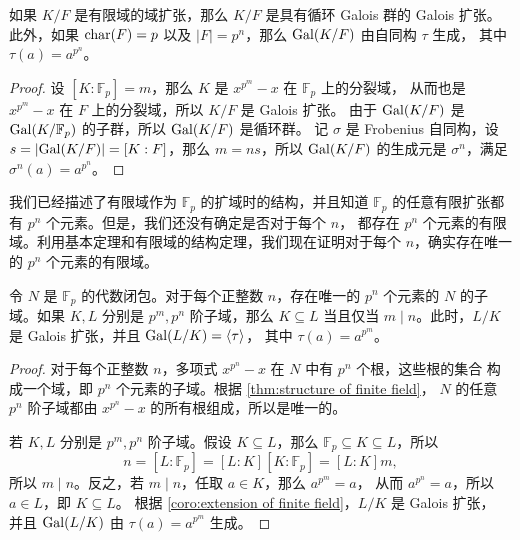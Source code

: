 \begin{corollary}\label{coro:extension of finite field}
  如果 $K/F$ 是有限域的域扩张，那么 $K/F$ 是具有循环 Galois 群的 Galois 扩张。
  此外，如果 $\operatorname{char}(F)=p$ 以及 $|F|=p^n$，那么 $\operatorname{Gal}(K/F)$ 由自同构 $\tau$ 生成，
  其中 $\tau(a)=a^{p^n}$。
\end{corollary}
\begin{proof}
  设 $[K:\mathbb{F}_p]=m$，那么 $K$ 是 $x^{p^m}-x$ 在 $\mathbb{F}_p$ 上的分裂域，
  从而也是 $x^{p^m}-x$ 在 $F$ 上的分裂域，所以 $K/F$ 是 Galois 扩张。
  由于 $\operatorname{Gal}(K/F)$ 是 $\operatorname{Gal}(K/\mathbb{F}_p)$ 的子群，所以 $\operatorname{Gal}(K/F)$ 是循环群。
  记 $\sigma$ 是 Frobenius 自同构，设 $s=\lvert\operatorname{Gal}(K/F)\rvert=[K:F]$，那么
  $m=ns$，所以 $\operatorname{Gal}(K/F)$ 的生成元是 $\sigma^n$，满足 $\sigma^n(a)=a^{p^n}$。
\end{proof}

我们已经描述了有限域作为 $\mathbb{F}_p$ 的扩域时的结构，并且知道 $\mathbb{F}_p$
的任意有限扩张都有 $p^n$ 个元素。但是，我们还没有确定是否对于每个 $n$，
都存在 $p^n$ 个元素的有限域。利用基本定理和有限域的结构定理，我们现在证明对于每个
$n$，确实存在唯一的 $p^n$ 个元素的有限域。

\begin{theorem}
  令 $N$ 是 $\mathbb{F}_p$ 的代数闭包。对于每个正整数 $n$，存在唯一的 $p^n$
  个元素的 $N$ 的子域。如果 $K,L$ 分别是 $p^m,p^n$ 阶子域，那么 $K\subseteq L$
  当且仅当 $m\mid n$。此时，$L/K$ 是 Galois 扩张，并且 $\operatorname{Gal}(L/K)=\langle \tau\rangle$，
  其中 $\tau(a)=a^{p^m}$。
\end{theorem}
\begin{proof}
  对于每个正整数 $n$，多项式 $x^{p^n}-x$ 在 $N$ 中有 $p^n$ 个根，这些根的集合
  构成一个域，即 $p^n$ 个元素的子域。根据 \autoref{thm:structure of finite field}，
  $N$ 的任意 $p^n$ 阶子域都由 $x^{p^n}-x$ 的所有根组成，所以是唯一的。

  若 $K,L$ 分别是 $p^m,p^n$ 阶子域。假设 $K\subseteq L$，那么 $\mathbb{F}_p\subseteq K\subseteq L$，所以
  \[
    n=[L:\mathbb{F}_p]=[L:K][K:\mathbb{F}_p]=[L:K]m,
  \]
  所以 $m\mid n$。反之，若 $m\mid n$，任取 $a\in K$，那么 $a^{p^m}=a$，
  从而 $a^{p^n}=a$，所以 $a\in L$，即 $K\subseteq L$。
  根据 \autoref{coro:extension of finite field}，$L/K$ 是 Galois 扩张，
  并且 $\operatorname{Gal}(L/K)$ 由 $\tau(a)=a^{p^m}$ 生成。
\end{proof}

